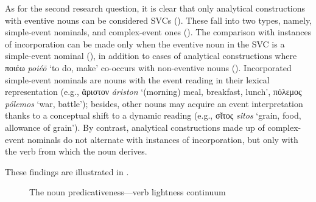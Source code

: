 \documentclass[output=paper,colorlinks,citecolor=brown]{langscibook}
\begin{document}
As for the second research question, it is clear that only analytical constructions with eventive nouns can be considered SVCs (). These fall into two types, namely, simple-event nominals, and complex-event ones (). The comparison with instances of incorporation can be made only when the eventive noun in the SVC is a simple-event nominal (), in addition to cases of analytical constructions where ποιέω \textit{poiéō} `to do, make' co-occurs with non-eventive nouns (). Incorporated simple-event nominals are nouns with the event reading in their lexical representation (e.g., ἄριστον \textit{áriston} ‘(morning) meal, breakfast, lunch', πόλεμος \textit{pólemos} ‘war, battle'); besides, other nouns may acquire an event interpretation thanks to a conceptual shift to a dynamic reading (e.g., σῖτος \textit{sîtos} ‘grain, food, allowance of grain'). By contrast, analytical constructions made up of complex-event nominals do not alternate with instances of incorporation, but only with the verb from which the noun derives.

These findings are illustrated in .

\begin{figure}
	\caption{The noun predicativeness---verb lightness continuum}
	\label{figtab:incorporations}
\end{figure}
\end{document}
